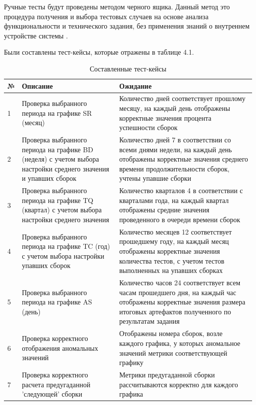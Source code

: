 Ручные тесты будут проведены методом черного ящика. Данный метод это процедура получения и выбора тестовых случаев на основе анализа функциональности и технического задания, без применения знаний о внутреннем устройстве системы \cite{blacktest}.

Были составлены тест-кейсы, которые отражены в таблице 4.1.

\begin{table}
    \centering
    \caption{Составленные тест-кейсы}
    \begin{tabular}{|p{1cm}|p{5cm}|p{9cm}|}
    \hline
        № & Описание & Ожидание  \\ \hline
        1 & Проверка выбранного периода на графике SR (месяц) & Количество  дней соответствует прошлому месяцу, на каждый день отображены корректные значения процента успешности сборок\\ \hline
        2 & Проверка выбранного периода на графике BD (неделя) с учетом выбора настройки среднего значения и  упавших сборок& Количество  дней 7 в соответствии со всеми днями недели, на каждый день отображены корректные значения среднего времени продолжительности сборок, учтены упавшие сборки \\ \hline
        3 & Проверка выбранного периода на графике TQ (квартал) с учетом выбора настройки среднего значения & Количество  кварталов 4 в соответствии с кварталами года, на каждый квартал отображены средние значения проведенного в очереди времени сборок  \\ \hline
        4 & Проверка выбранного периода на графике TC (год) с учетом выбора настройки упавших сборок & Количество  месяцев 12 соответствует прошедшему году, на каждый месяц отображены корректные значения  количества тестов, с учетом тестов выполненных на упавших сборках \\ \hline
        5 & Проверка выбранного периода на графике AS (день) & Количество  часов 24 соответствует всем часам прошедшего дня, на каждый час отображены корректные значения размера итоговых артефактов полученного по результатам задания   \\ \hline
        6 & Проверка корректного отображения аномальных значений & Отображены номера сборок, возле каждого графика, у которых аномальное значений метрики соответствующей графику   \\ \hline
        7 & Проверка корректного расчета предугаданной 'следующей' сборки& Метрики предугаданной сборки рассчитываются корректно для каждого графика   \\ \hline

    \end{tabular}
\end{table}


